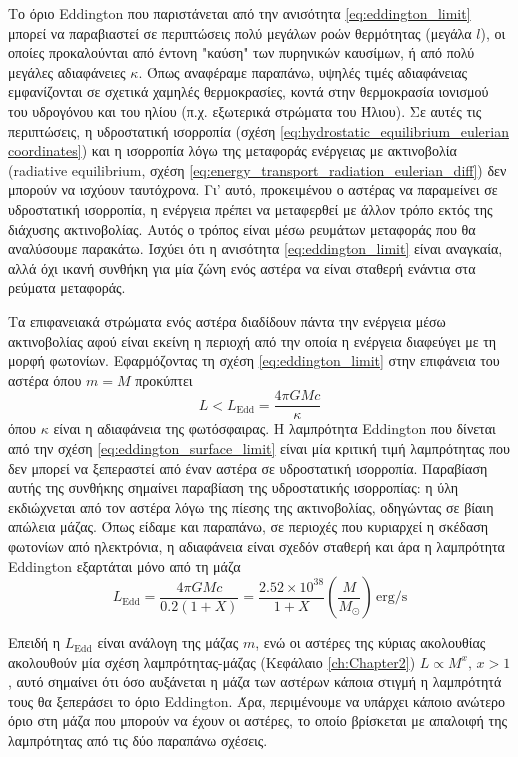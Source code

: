 Το όριο Eddington που παριστάνεται από την ανισότητα \eqref{eq:eddington_limit} μπορεί να παραβιαστεί σε περιπτώσεις πολύ μεγάλων ροών θερμότητας (μεγάλα $l$), οι οποίες προκαλούνται από έντονη "καύση" των πυρηνικών καυσίμων, ή από πολύ μεγάλες αδιαφάνειες $\kappa$. Όπως αναφέραμε παραπάνω, υψηλές τιμές αδιαφάνειας εμφανίζονται σε σχετικά χαμηλές θερμοκρασίες, κοντά στην θερμοκρασία ιονισμού του υδρογόνου και του ηλίου (π.χ. εξωτερικά στρώματα του Ήλιου). Σε αυτές τις περιπτώσεις, η υδροστατική ισορροπία (σχέση \ref{eq:hydrostatic_equilibrium_eulerian coordinates}) και η ισορροπία λόγω της μεταφοράς ενέργειας με ακτινοβολία (radiative equilibrium, σχέση \ref{eq:energy_transport_radiation_eulerian_diff}) δεν μπορούν να ισχύουν ταυτόχρονα. Γι' αυτό, προκειμένου ο αστέρας να παραμείνει σε υδροστατική ισορροπία, η ενέργεια πρέπει να μεταφερθεί με άλλον τρόπο εκτός της διάχυσης ακτινοβολίας. Αυτός ο τρόπος είναι μέσω ρευμάτων μεταφοράς που θα αναλύσουμε παρακάτω. Ισχύει ότι η ανισότητα \eqref{eq:eddington_limit} είναι αναγκαία, αλλά όχι ικανή συνθήκη για μία ζώνη ενός αστέρα να είναι σταθερή ενάντια στα ρεύματα μεταφοράς.

Τα επιφανειακά στρώματα ενός αστέρα διαδίδουν πάντα την ενέργεια μέσω ακτινοβολίας αφού είναι εκείνη η περιοχή από την οποία η ενέργεια διαφεύγει με τη μορφή φωτονίων. Εφαρμόζοντας τη σχέση \eqref{eq:eddington_limit} στην επιφάνεια του αστέρα όπου $m=M$ προκύπτει
\begin{equation}
    \label{eq:eddington_surface_limit}
    L < L_{\text{Edd}} = \frac{4\pi G M c}{\kappa} 
\end{equation}
όπου $\kappa$ είναι η αδιαφάνεια της φωτόσφαιρας. Η λαμπρότητα Eddington που δίνεται από την σχέση \eqref{eq:eddington_surface_limit} είναι μία κριτική τιμή λαμπρότητας που δεν μπορεί να ξεπεραστεί από έναν αστέρα σε υδροστατική ισορροπία. Παραβίαση αυτής της συνθήκης σημαίνει παραβίαση της υδροστατικής ισορροπίας: η ύλη εκδιώχνεται από τον αστέρα λόγω της πίεσης της ακτινοβολίας, οδηγώντας σε βίαιη απώλεια μάζας. Όπως είδαμε και παραπάνω, σε περιοχές που κυριαρχεί η σκέδαση φωτονίων από ηλεκτρόνια, η αδιαφάνεια είναι σχεδόν σταθερή και άρα η λαμπρότητα Eddington εξαρτάται μόνο από τη μάζα
\begin{equation}
    \label{eq:eddington_luminosity_electron_scattering_opacity}
    L_{\text{Edd}} = \frac{4\pi G M c}{0.2 (1+X)} = \frac{2.52 \times 10^{38}}{1+X} \left( \frac{M}{M_\odot} \right) \,\text{erg/s}
\end{equation}

Επειδή η $L_{\text{Edd}}$ είναι ανάλογη της μάζας $m$, ενώ οι αστέρες της κύριας ακολουθίας ακολουθούν μία σχέση λαμπρότητας-μάζας (Κεφάλαιο \ref{ch:Chapter2}) $L \propto M^x,  \,x>1$, αυτό σημαίνει ότι όσο αυξάνεται η μάζα των αστέρων κάποια στιγμή η λαμπρότητά τους θα ξεπεράσει το όριο Eddington. Άρα, περιμένουμε να υπάρχει κάποιο ανώτερο όριο στη μάζα που μπορούν να έχουν οι αστέρες, το οποίο βρίσκεται με απαλοιφή της λαμπρότητας από τις δύο παραπάνω σχέσεις.

